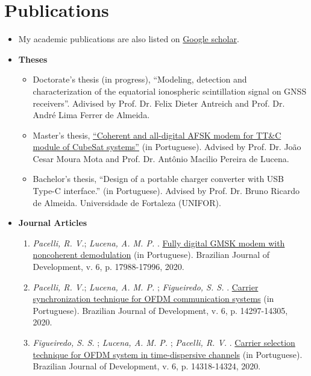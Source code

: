 \section{Publications}

\begin{itemize}[leftmargin=0.15in, label={}] %
    \item My academic publications are also listed on \href{https://scholar.google.com.br/citations?user=Kj6Gzs4AAAAJ&hl=pt-BR&oi=sra}{Google scholar}.
    \item \textbf{Theses}
    \begin{itemize}%
        \item Doctorate's thesis (in progress), ``Modeling, detection and characterization of the equatorial ionospheric scintillation signal on GNSS receivers''. Adivised by Prof. Dr. Felix Dieter Antreich and Prof. Dr. André Lima Ferrer de Almeida.
        \item Master's thesis, \href{http://repositorio.ufc.br/bitstream/riufc/60259/1/2021_dis_rvpacelli.pdf}{``Coherent and all-digital AFSK modem for TT\&C module of CubeSat systems''} (in Portuguese). Advised by Prof. Dr. João Cesar Moura Mota and Prof. Dr. Antônio Macilio Pereira de Lucena.
        \item Bachelor's thesis, ``Design of a portable charger converter with USB Type-C interface.'' (in Portuguese). Advised by Prof. Dr. Bruno Ricardo de Almeida. Universidade de Fortaleza (UNIFOR).
    \end{itemize}
    \item \textbf{Journal Articles}
    \begin{enumerate}[label=\textbf{J\arabic*.}, align=left, leftmargin=1.5cm]
        \item \textit{Pacelli, R. V.}; \textit{Lucena, A. M. P.} . \href{https://www.brazilianjournals.com/index.php/BRJD/article/view/8538/7345}{Fully digital GMSK modem with noncoherent demodulation} (in Portuguese). Brazilian Journal of Development, v. 6, p. 17988-17996, 2020.
        \item \textit{Pacelli, R. V.}; \textit{Lucena, A. M. P.} ; \textit{Figueiredo, S. S.} . \href{https://www.brazilianjournals.com/index.php/BRJD/article/view/7944/6883}{Carrier synchronization technique for OFDM communication systems} (in Portuguese). Brazilian Journal of Development, v. 6, p. 14297-14305, 2020.
        \item \textit{Figueiredo, S. S.} ; \textit{Lucena, A. M. P.} ; \textit{Pacelli, R. V.} . \href{https://www.brazilianjournals.com/index.php/BRJD/article/view/7946/6889}{Carrier selection technique for OFDM system in time-dispersive channels} (in Portuguese). Brazilian Journal of Development, v. 6, p. 14318-14324, 2020.

\end{enumerate}
\end{itemize}
